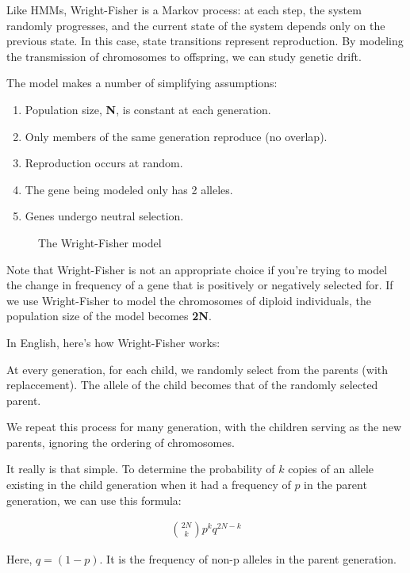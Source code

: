 Like HMMs, Wright-Fisher is a Markov process: at each step, the system
randomly progresses, and the current state of the system depends only 
on the previous state. In this case, state transitions represent reproduction.
By modeling the transmission of chromosomes to offspring, we can study genetic drift.

The model makes a number of simplifying assumptions:
\begin{enumerate}
\item Population size, \textbf{N}, is constant at each generation.
\item Only members of the same generation reproduce (no overlap).
\item Reproduction occurs at random.
\item The gene being modeled only has 2 alleles.
\item Genes undergo neutral selection.
\end{enumerate}

\begin{figure} [ht!] 
  \centering 
  \caption{The Wright-Fisher model}
  \label{Fig13_FisherWrightModel}
\end{figure}

Note that Wright-Fisher is not an appropriate choice if you're trying to
model the change in frequency of a gene that is positively or negatively
selected for. If we use Wright-Fisher to model the chromosomes of diploid
individuals, the population size of the model becomes \textbf{2N}.


In English, here's how Wright-Fisher works:

At every generation, for each child, we randomly select from the parents (with replaccement). The allele of the child becomes that of the randomly selected parent.

We repeat this process for many generation, with the children serving as the new parents, ignoring the ordering of chromosomes.


It really is that simple. To determine the probability of $k$ copies of an allele
existing in the child generation when it had a frequency of $p$ in the parent
generation, we can use this formula:

\begin{align}
\binom{2N}{k} p^{k} q^{2N-k}
\end{align}

Here, $q = (1-p)$. It is the frequency of non-p alleles in the parent generation.

